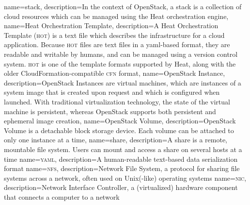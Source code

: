 {
  name={stack},
  description={In the context of \gls{OpenStack}, a stack is a
  collection of cloud resources which can be managed using the
  \gls{Heat} orchestration engine},
}
{
  name={Heat Orchestration Template},
  description={A \gls{Heat} Orchestration Template (\textsc{hot}) is a text
  file which describes the infrastructure for a cloud application.
  Because \textsc{hot} files are text files in a \gls{yaml}-based format, they
  are readable and writable by humans, and can be managed using a
  version control system.  \textsc{hot} is one of the template formats
  supported by Heat, along with the older CloudFormation-compatible
  \textsc{cfn} format},
}
{
  name={OpenStack Instance},
  description={OpenStack Instances are virtual machines, which are
  instances of a system image that is created upon request and which
  is configured when launched. With traditional virtualization
  technology, the state of the virtual machine is persistent, whereas
  OpenStack supports both persistent and ephemeral image creation},
}
{
  name={OpenStack Volume},
  description={OpenStack Volume is a detachable block storage device.
  Each volume can be attached to only one instance at a time},
}
{
  name={share},
  description={A share is a remote, mountable file system. Users can
  mount and access a share on several hosts at a time}
}
{
  name={\textsc{yaml}},
  description={A human-readable text-based data serialization
  format}
}
{
  name={\textsc{nfs}},
  description={Network File System, a protocol for sharing file
    systems across a network, often used on Unix(-like) operating
    systems}
}
{
  name={\textsc{nic}},
  description={Network Interface Controller, a (virtualized)
    hardware component that connects a computer to a network}
}
